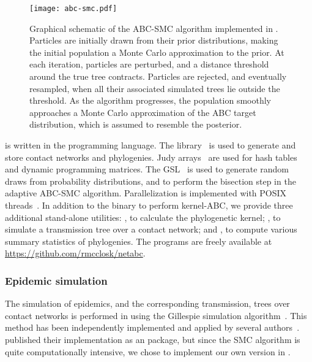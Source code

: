 \begin{figure}
    \texttt{[image: abc-smc.pdf]}
    \caption[Graphical schematic of \gls{ABC}-\gls{SMC} algorithm.]{
      Graphical schematic of the \gls{ABC}-\gls{SMC} algorithm implemented in
      . Particles are initially drawn from their prior
      distributions, making the initial population a Monte Carlo approximation
      to the prior. At each iteration, particles are perturbed, and a distance
      threshold around the true tree contracts. Particles are rejected, and
      eventually resampled, when all their associated simulated trees lie
      outside the threshold. As the algorithm progresses, the population
      smoothly approaches a Monte Carlo approximation of the \gls{ABC} target
      distribution, which is assumed to resemble the posterior.
    }
    \label{fig:abcsmc}
\end{figure}

 is written in the  programming language. The
 library~\autocite{csardi2006igraph} is used to generate and
store contact networks and phylogenies. Judy arrays~\autocite{baskins2004judy}
are used for hash tables and dynamic programming matrices. The
\gls{GSL}~\autocite{gough2009gnu} is used to generate random draws from
probability distributions, and to perform the bisection step in the adaptive
\gls{ABC}-\gls{SMC} algorithm. Parallelization is implemented with POSIX
threads~\autocite{barney2009posix}. In addition to the  binary
to perform kernel-\gls{ABC}, we provide three additional stand-alone utilities:
, to calculate the phylogenetic kernel;
, to simulate a transmission tree over a contact network; and
, to compute various summary statistics of phylogenies. The
programs are freely available at \url{https://github.com/rmcclosk/netabc}.

\subsubsection*{Epidemic simulation}
\label{subsubsec:nettree}

The simulation of epidemics, and the corresponding transmission, trees over
contact networks is performed in  using the Gillespie
simulation algorithm~\autocite{gillespie1976general}. This method has been
independently implemented and applied by several
authors~\autocite[\textit{e.g.}][]{o2010contact, robinson2013dynamics,
leventhal2012inferring, groendyke2011bayesian, villandre2016assessment}.
\textcite{groendyke2011bayesian} published their implementation as an
 package, but since the \gls{SMC} algorithm is quite
computationally intensive, we chose to implement our own version in
.

